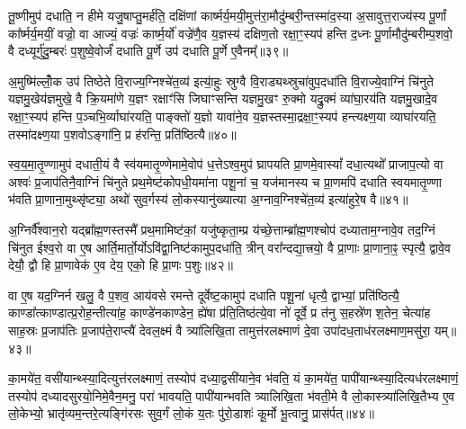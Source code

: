 तू॒ष्णीमुप॑ दधाति॒ न हीमे यजु॒षाप्तु॒मर्\mbox{}ह॑ति॒ दक्षि॑णां कार्ष्मर्य॒मयी॒मुत्त॑रा॒मौदु॑म्बरी॒न्तस्मा॑द॒स्या अ॒सावुत्त॒राज्य॑स्य पू॒र्णां का᳚र्ष्मर्य॒मयीं॒ वज्रो॒ वा आज्यं॒ वज्रः॑ कार्ष्म॒र्यो॑ वज्रे॑णै॒व य॒ज्ञस्य॑ दक्षिण॒तो रक्षा॒ꣳ॒स्यप॑ हन्ति द॒ध्नः पू॒र्णामौदु॑म्बरीम्प॒शवो॒ वै दध्यूर्गु॑दु॒म्बरः॑ प॒शुष्वे॒वोर्जं॑ दधाति पू॒र्णे उप॑ दधाति पू॒र्णे ए॒वैनम्᳚॥३९॥

अ॒मुष्मि॑ल्लोँ॒क उप॑ तिष्ठेते वि॒राज्य॒ग्निश्चे॑त॒व्य॑ इत्या॒॑हुः स्रुग्वै वि॒राड्यथ्स्रुचा॑वुप॒दधा॑ति वि॒राज्ये॒वाग्निं चि॑नुते यज्ञमु॒खेय॑ज्ञमुखे॒ वै क्रि॒यमा॑णे य॒ज्ञꣳ रक्षाꣳ॑सि जिघाꣳसन्ति यज्ञमु॒खꣳ रु॒क्मो यद्रु॒क्मं व्या॑घा॒रय॑ति यज्ञमु॒खादे॒व रक्षा॒ꣳ॒स्यप॑ हन्ति प॒ञ्चभि॒र्व्याघा॑रयति॒ पाङ्क्तो॑ य॒ज्ञो यावा॑ने॒व य॒ज्ञस्तस्मा॒द्रक्षा॒ꣳ॒स्यप॑ हन्त्यक्ष्ण॒या व्याघा॑रयति॒ तस्मा॑दक्ष्ण॒या प॒शवो\-ऽङ्गा॑नि॒ प्र ह॑रन्ति॒ प्रति॑ष्ठित्यै॥४०॥

{\anuvakamend[{वन॒स्पत॑यो दक्षिण॒तो ध॑त्त एन॒न्तस्मा॑दक्ष्ण॒या पञ्च॑ च॥७॥}]}

स्व॒य॒मा॒तृ॒ण्णामुप॑ दधाती॒यं वै स्व॑यमातृ॒ण्णेमामे॒वोप॑ ध॒त्ते\-ऽश्व॒मुप॑ घ्रापयति प्रा॒णमे॒वास्यां᳚ दधा॒त्यथो᳚ प्राजाप॒त्यो वा अश्वः॑ प्र॒जाप॑तिनै॒वाग्निं चि॑नुते प्रथ॒मेष्ट॑कोपधी॒यमा॑ना पशू॒नां च॒ यज॑मानस्य च प्रा॒णमपि॑ दधाति स्वयमातृ॒ण्णा भ॑वति प्रा॒णाना॒मुथ्सृ॑ष्ट्या॒ अथो॑ सुव॒र्गस्य॑ लो॒कस्यानु॑ख्यात्या अ॒ग्नाव॒ग्निश्चे॑त॒व्य॑ इत्या॑हुरे॒ष वै॥४१॥

अ॒ग्निर्वै᳚श्वान॒रो यद्ब्रा᳚ह्म॒णस्तस्मै᳚ प्रथ॒मामिष्ट॑कां॒ यजु॑ष्कृता॒म्प्र य॑च्छे॒त्ताम्ब्रा᳚ह्म॒णश्चोप॑ दध्याताम॒ग्नावे॒व तद॒ग्निं चि॑नुत ईश्व॒रो वा ए॒ष आर्ति॒मार्तो॒र्यो\-ऽवि॑द्वा॒निष्ट॑कामुप॒दधा॑ति॒ त्रीन् वरा᳚न्दद्या॒त्त्रयो॒ वै प्रा॒णाः प्रा॒णाना॒ꣴ॒ स्पृत्यै॒ द्वावे॒व देयौ॒ द्वौ हि प्रा॒णावेक॑ ए॒व देय॒ एको॒ हि प्रा॒णः प॒शुः॥४२॥

वा ए॒ष यद॒ग्निर्न खलु॒ वै प॒शव॒ आय॑वसे रमन्ते दूर्वेष्ट॒कामुप॑ दधाति पशू॒नां धृत्यै॒ द्वाभ्यां॒ प्रति॑ष्ठित्यै॒ काण्डा᳚त्काण्डात्प्र॒रोह॒न्तीत्या॑ह॒ काण्डे॑नकाण्डेन॒ ह्ये॑षा प्र॑ति॒तिष्ठ॑त्ये॒वा नो॑ दूर्वे॒ प्र त॑नु स॒हस्रे॑ण श॒तेन॒ चेत्या॑ह साह॒स्रः प्र॒जाप॑तिः प्र॒जाप॑ते॒राप्त्यै॑ देवल॒क्ष्मं वै त्र्या॑लिखि॒ता तामुत्त॑रलक्ष्माणं दे॒वा उपा॑दध॒ताध॑रलक्ष्माण॒मसु॑रा॒ यम्॥४३॥

का॒मये॑त॒ वसी॑यान्थ्स्या॒दित्युत्त॑रलक्ष्माणं॒ तस्योप॑ दध्या॒द्वसी॑याने॒व भ॑वति॒ यं का॒मये॑त॒ पापी॑यान्थ्स्या॒दित्यध॑र\-लक्ष्माणं॒ तस्योप॑ दध्यादसुरयो॒निमे॒वैन॒मनु॒ परा॑ भावयति॒ पापी॑यान्भवति त्र्यालिखि॒ता भ॑वती॒मे वै लो॒का\-स्त्र्या॑लिखि॒तैभ्य ए॒व लो॒केभ्यो॒ भ्रातृ॑व्यम॒न्तरे॒त्यङ्गि॑रसः सुव॒र्गं लो॒कं य॒तः पु॑रो॒डाशः॑ कू॒र्मो भू॒त्वानु॒ प्रास॑र्पत्॥४४॥

